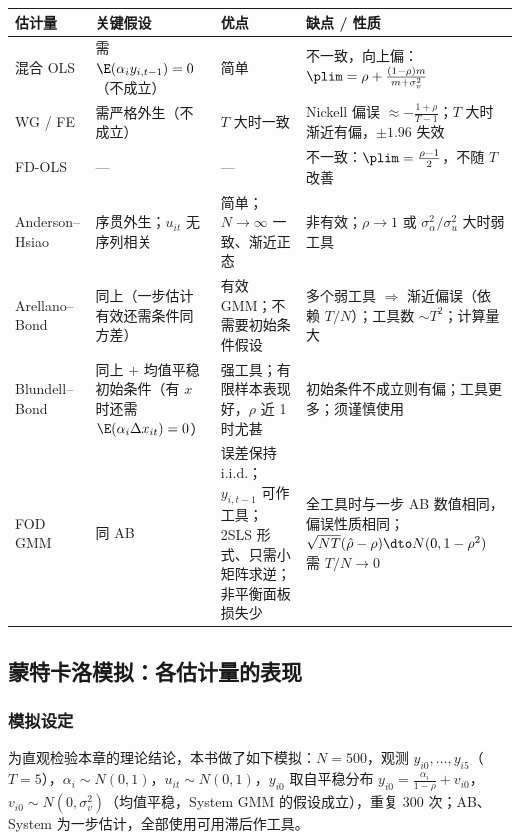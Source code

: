 \begin{center}
\footnotesize
\renewcommand{\arraystretch}{1.3}
\begin{tabularx}{\linewidth}{>{\raggedright\arraybackslash}p{1.75cm}>{\raggedright\arraybackslash}p{3.6cm}>{\raggedright\arraybackslash}p{3.6cm}L}
\toprule
估计量 & 关键假设 & 优点 & 缺点 / 性质\\
\midrule
混合 OLS & 需 $\E(\alpha_iy_{i,t-1})=0$（不成立） & 简单 & 不一致，向上偏：$\plim=\rho+\frac{(1-\rho)m}{m+\sigma_v^2}$\\
WG / FE & 需严格外生（不成立） & $T$ 大时一致 & Nickell 偏误 $\approx-\frac{1+\rho}{T-1}$；$T$ 大时渐近有偏，$\pm1.96$ 失效\\
FD-OLS & — & — & 不一致：$\plim=\frac{\rho-1}{2}$，不随 $T$ 改善\\
Anderson--Hsiao & 序贯外生；$u_{it}$ 无序列相关 & 简单；$N\to\infty$ 一致、渐近正态 & 非有效；$\rho\to1$ 或 $\sigma_\alpha^2/\sigma_u^2$ 大时弱工具\\
Arellano--Bond & 同上（一步估计有效还需条件同方差） & 有效 GMM；不需要初始条件假设 & 多个弱工具 $\Rightarrow$ 渐近偏误（依赖 $T/N$）；工具数 $\sim T^2$；计算量大\\
Blundell--Bond & 同上 $+$ 均值平稳初始条件（有 $x$ 时还需 $\E(\alpha_i\Delta x_{it})=0$） & 强工具；有限样本表现好，$\rho$ 近 1 时尤甚 & 初始条件不成立则有偏；工具更多；须谨慎使用\\
FOD GMM & 同 AB & 误差保持 i.i.d.；$y_{i,t-1}$ 可作工具；2SLS 形式、只需小矩阵求逆；非平衡面板损失少 & 全工具时与一步 AB 数值相同，偏误性质相同；$\sqrt{NT}(\hat\rho-\rho)\dto N(0,1-\rho^2)$ 需 $T/N\to0$\\
\bottomrule
\end{tabularx}
\label{tab:U12c-comp2}
\end{center}

\subsection{蒙特卡洛模拟：各估计量的表现}\label{sec:U12c-mc}

\subsubsection{模拟设定}

为直观检验本章的理论结论，本书做了如下模拟：$N=500$，观测 $y_{i0},\dots,y_{i5}$（$T=5$），$\alpha_i\sim N(0,1)$，$u_{it}\sim N(0,1)$，$y_{i0}$ 取自平稳分布 $y_{i0}=\frac{\alpha_i}{1-\rho}+v_{i0}$，$v_{i0}\sim N(0,\sigma_v^2)$（均值平稳，System GMM 的假设成立），重复 300 次；AB、System 为一步估计，全部使用可用滞后作工具。

